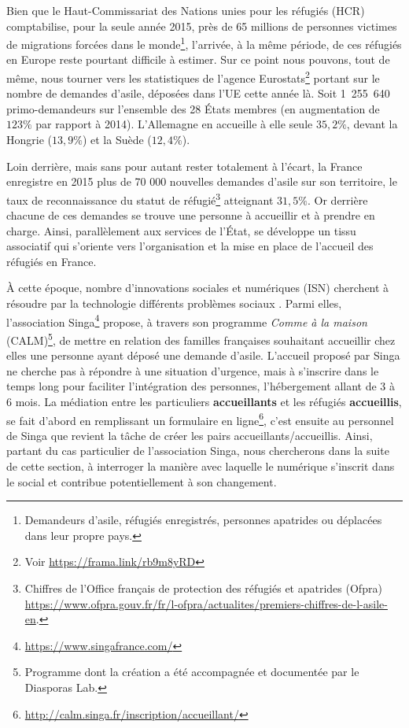 \documentclass[symmetric,justified,marginals=raggedouter]{tufte-book}
\begin{document}
Bien que le Haut-Commissariat des Nations unies pour les réfugiés (HCR) comptabilise, pour la seule année 2015, près de 65 millions de personnes victimes de migrations forcées dans le monde\footnote{\RaggedOuter Demandeurs d'asile, réfugiés enregistrés, personnes apatrides ou déplacées dans leur propre pays.}, l'arrivée, à la même période, de ces réfugiés en Europe reste pourtant difficile à estimer. Sur ce point nous pouvons, tout de même, nous tourner vers les statistiques de l'agence Eurostats\footnote{\RaggedOuter Voir \url{https://frama.link/rb9m8yRD}} portant sur le nombre de demandes d'asile, déposées dans l'UE cette année là. Soit 1~255~640 primo-demandeurs sur l'ensemble des 28 États membres (en augmentation de $123\%$ par rapport à 2014). L'Allemagne en accueille à elle seule $35,2\%$, devant la Hongrie ($13,9\%$) et la Suède ($12,4\%$).

Loin derrière, mais sans pour autant rester totalement à l'écart, la France enregistre en 2015 plus de 70 000 nouvelles demandes d'asile sur son territoire, le taux de reconnaissance du statut de réfugié\footnote{\RaggedOuter Chiffres de l'Office français de protection des réfugiés et apatrides (Ofpra) \url{https://www.ofpra.gouv.fr/fr/l-ofpra/actualites/premiers-chiffres-de-l-asile-en}.} atteignant $31,5\%$. Or derrière chacune de ces demandes se trouve une personne à accueillir et à prendre en charge. Ainsi, parallèlement aux services de l'État, se développe un tissu associatif qui s'oriente vers l'organisation et la mise en place de l'accueil des réfugiés en France. 

À cette époque, nombre d'innovations sociales et numériques (ISN) cherchent à résoudre par la technologie différents problèmes sociaux \citep{gossart_panorama_2018}. Parmi elles, l'association Singa\footnote{\RaggedOuter \url{https://www.singafrance.com/}} propose, à travers son programme \textit{Comme à la maison} (CALM)\footnote{\RaggedOuter Programme dont la création a été accompagnée et documentée par le Diasporas Lab.}, de mettre en relation des familles françaises souhaitant accueillir chez elles une personne ayant déposé une demande d'asile. L'accueil proposé par Singa ne cherche pas à répondre à une situation d'urgence, mais à s'inscrire dans le temps long pour faciliter l'intégration des personnes, l'hébergement allant de 3 à 6 mois. La médiation entre les particuliers \textbf{accueillants} et les réfugiés \textbf{accueillis}, se fait d'abord en remplissant un formulaire en ligne\footnote{\RaggedOuter \url{http://calm.singa.fr/inscription/accueillant/}}, c'est ensuite au personnel de Singa que revient la tâche de créer les pairs accueillants/accueillis. Ainsi, partant du cas particulier de l'association Singa, nous chercherons dans la suite de cette section, à interroger la manière avec laquelle le numérique s'inscrit dans le social et contribue potentiellement à son changement. 
\end{document}
